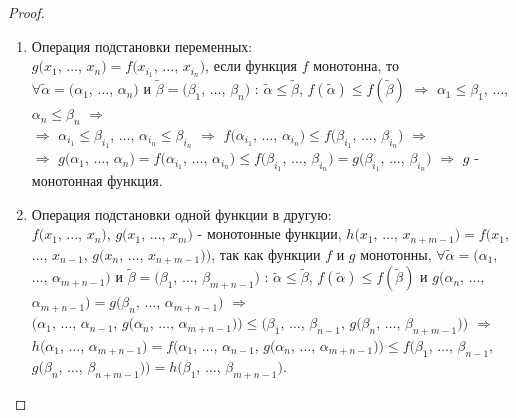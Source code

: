 \documentclass[a4paper, 12pt]{article}
\theoremstyle{definition}
\theoremstyle{plain}
\theoremstyle{remark}
\begin{document}
  \begin{proof}
    \begin{enumerate}
      \item Операция подстановки переменных:\\
      $g(x_1$, $\ldots$, $x_n)=f(x_{i_1}$, $\ldots$, $x_{i_n})$, если функция $f$ монотонна, то\\ $\forall\tilde{\alpha}=(\alpha_1$, $\ldots$, $\alpha_n)$ и $\tilde{\beta}=(\beta_1$, $\ldots$, $\beta_n)$ : $\tilde{\alpha}\leqslant\tilde{\beta}$, $f(\tilde{\alpha})\leqslant f(\tilde{\beta})$ $\Longrightarrow$ $\alpha_1\leqslant\beta_1$, $\ldots$, $\alpha_n\leqslant\beta_n$ $\Longrightarrow$\\
      $\Longrightarrow$ $\alpha_{i_1}\leqslant\beta_{i_1}$, $\ldots$, $\alpha_{i_n}\leqslant\beta_{i_n}$ $\Longrightarrow$ $f(\alpha_{i_1}$, $\ldots$, $\alpha_{i_n})\leqslant f(\beta_{i_1}$, $\ldots$, $\beta_{i_n})$ $\Longrightarrow$\\
      $\Longrightarrow$ $g(\alpha_{1}$, $\ldots$, $\alpha_{n})=f(\alpha_{i_1}$, $\ldots$, $\alpha_{i_n})\leqslant f(\beta_{i_1}$, $\ldots$, $\beta_{i_n})=g(\beta_{i_1}$, $\ldots$, $\beta_{i_n})$ $\Longrightarrow$ $g$ - монотонная функция.
      \item Операция подстановки одной функции в другую:\\ 
      $f(x_{1}$, $\ldots$, $x_{n})$, $g(x_{1}$, $\ldots$, $x_{m})$ - монотонные функции, $h(x_1$, $\ldots$, $x_{n+m-1})=f(x_1$, $\ldots$, $x_{n-1}$, $g(x_n$, $\ldots$, $x_{n+m-1}))$, так как функции $f$ и $g$ монотонны, $\forall\tilde{\alpha}=(\alpha_1$, $\ldots$, $\alpha_{m+n-1})$ и $\tilde{\beta}=(\beta_1$, $\ldots$, $\beta_{m+n-1})$ : $\tilde{\alpha}\leqslant\tilde{\beta}$, $f(\tilde{\alpha})\leqslant f(\tilde{\beta})$ и $g(\alpha_n$, $\ldots$, $\alpha_{m+n-1})=g(\beta_n$, $\ldots$, $\alpha_{m+n-1})$ $\Longrightarrow$\\
      $(\alpha_1$, $\ldots$, $\alpha_{n-1}$, $g(\alpha_n$, $\ldots$, $\alpha_{m+n-1}))\leqslant (\beta_1$, $\ldots$, $\beta_{n-1}$, $g(\beta_n$, $\ldots$, $\beta_{n+m-1}))$ $\Longrightarrow$ $h(\alpha_1$, $\ldots$, $\alpha_{m+n-1})=f(\alpha_1$, $\ldots$, $\alpha_{n-1}$, $g(\alpha_n$, $\ldots$, $\alpha_{m+n-1}))\leqslant f(\beta_1$, $\ldots$, $\beta_{n-1}$, $g(\beta_n$, $\ldots$, $\beta_{n+m-1}))=h(\beta_1$, $\ldots$, $\beta_{m+n-1})$.

\end{enumerate}
\end{proof}
\end{document}
